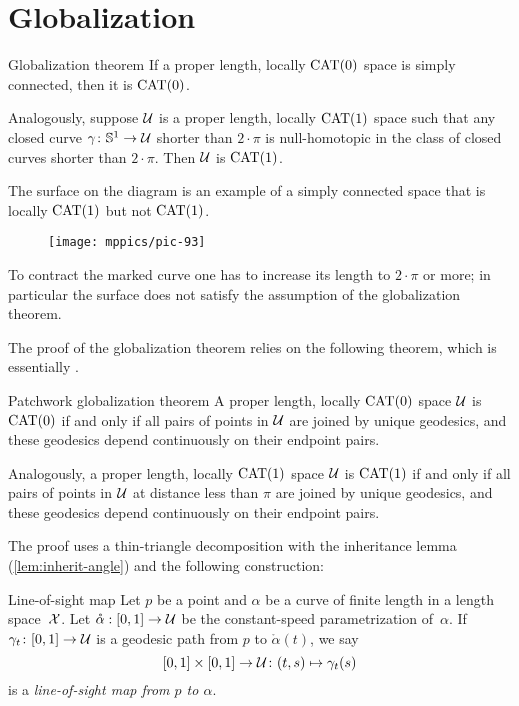 \section{Globalization}\label{sec:Hadamard--Cartan}



\begin{thm}{Globalization theorem}
\label{thm:hadamard-cartan}
If a proper length, locally $\mathrm{CAT}(0)$ space is simply connected, then it 
is $\mathrm{CAT}(0)$.

Analogously, suppose $\mathcal{U}$ is a proper length, locally $\mathrm{CAT}(1)$ space
such that any closed curve $\gamma\colon\mathbb{S}^1\to \mathcal{U}$ shorter than $2\cdot\pi$
is null-homotopic in the class of closed curves shorter than $2\cdot\pi$.
Then $\mathcal{U}$ is $\mathrm{CAT}(1)$.
\end{thm}


The surface on the diagram 
is an example of a simply connected space that  is locally $\mathrm{CAT}(1)$ but not $\mathrm{CAT}(1)$.
\begin{figure}[h!]
\vskip0mm
\centering
\texttt{[image: mppics/pic-93]}
\end{figure}
To contract the marked curve one has to increase its length to $2\cdot\pi$ or more;
in particular the surface does not satisfy the assumption of the globalization theorem.


The proof of the globalization theorem relies on the following theorem, 
which is essentially  \cite[Satz 9]{alexandrov-1957}.  

\begin{thm}{Patchwork globalization theorem}\label{thm:alex-patch}
A proper length, locally $\mathrm{CAT}(0)$ space $\mathcal{U}$ is $\mathrm{CAT}(0)$
if and only if all pairs of points in $\mathcal{U}$  are joined by unique geodesics, and these geodesics depend continuously on their endpoint pairs.

Analogously, a proper length, locally $\mathrm{CAT}(1)$ space $\mathcal{U}$ is $\mathrm{CAT}(1)$ 
if and only if all pairs of points in $\mathcal{U}$ at distance less than $\pi$ are joined by unique geodesics, and these geodesics depend continuously on their endpoint pairs.
\end{thm}

The proof uses a thin-triangle decomposition with the inheritance lemma (\ref{lem:inherit-angle}) and the following construction:

\begin{thm}{Line-of-sight map} \label{def:sight}
Let  $p$ be a point and $\alpha$ be a curve of finite length in  a length space~$\mathcal{X}$. 
Let $\mathring\alpha:[0,1]\to\mathcal{U}$ be the constant-speed parametrization of~$\alpha$.  
If   $\gamma_t\colon[0,1]\to\mathcal{U}$ is a geodesic path from $p$ to $\mathring\alpha(t)$, we say 
\[
[0,1]\times[0,1]\to\mathcal{U}\colon(t,s)\mapsto\gamma_t(s)
\]
is a \emph{line-of-sight map from $p$ to $\alpha$}.  
\end{thm}

